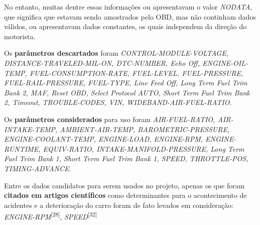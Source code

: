     No entanto, muitas dentre essas informações ou apresentavam o valor \textit{NODATA}, que significa que estavam sendo amostrados pelo OBD, mas não continham dados válidos, ou apresentavam dados constantes, os quais independem da direção do motorista.

    Os \textbf{parâmetros descartados} foram \textit{CONTROL-MODULE-VOLTAGE, DISTANCE-TRAVELED-MIL-ON, DTC-NUMBER, Echo Off, ENGINE-OIL-TEMP, FUEL-CONSUMPTION-RATE, FUEL-LEVEL, FUEL-PRESSURE, FUEL-RAIL-PRESSURE, FUEL-TYPE, Line Feed Off, Long Term Fuel Trim Bank 2, MAF, Reset OBD, Select Protocol AUTO, Short Term Fuel Trim Bank 2, Timeout, TROUBLE-CODES, VIN, WIDEBAND-AIR-FUEL-RATIO}.
    
    Os \textbf{parâmetros considerados} para uso foram \textit{AIR-FUEL-RATIO, AIR-INTAKE-TEMP, AMBIENT-AIR-TEMP, BAROMETRIC-PRESSURE, ENGINE-COOLANT-TEMP, ENGINE-LOAD, ENGINE-RPM, ENGINE-RUNTIME, EQUIV-RATIO, INTAKE-MANIFOLD-PRESSURE, Long Term Fuel Trim Bank 1, Short Term Fuel Trim Bank 1, SPEED, THROTTLE-POS, TIMING-ADVANCE}.
    
    Entre os dados candidatos para serem usados no projeto, apenas os que foram \textbf{citados em artigos científicos} como determinantes para o acontecimento de acidentes e a deterioração do carro foram de fato levados em consideração: \textit{ENGINE-RPM}\textsuperscript{[28]}, \textit{SPEED}\textsuperscript{[32]}


